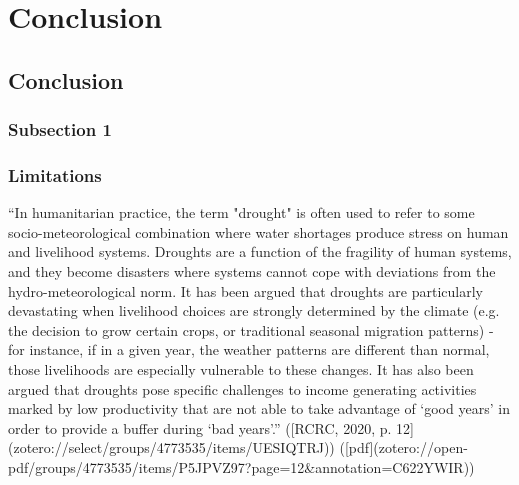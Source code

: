 
\chapter{Conclusion} %

\label{ChapterX} %


\section{Conclusion}

\subsection{Subsection 1}



\subsection{Limitations}


“In humanitarian practice, the term "drought" is often used to refer to some socio-meteorological combination where water shortages produce stress on human and livelihood systems. Droughts are a function of the fragility of human systems, and they become disasters where systems cannot cope with deviations from the hydro-meteorological norm. It has been argued that droughts are particularly devastating when livelihood choices are strongly determined by the climate (e.g. the decision to grow certain crops, or traditional seasonal migration patterns) - for instance, if in a given year, the weather patterns are different than normal, those livelihoods are especially vulnerable to these changes. It has also been argued that droughts pose specific challenges to income generating activities marked by low productivity that are not able to take advantage of ‘good years’ in order to provide a buffer during ‘bad years’.” ([RCRC, 2020, p. 12](zotero://select/groups/4773535/items/UESIQTRJ)) ([pdf](zotero://open-pdf/groups/4773535/items/P5JPVZ97?page=12&annotation=C622YWIR))

